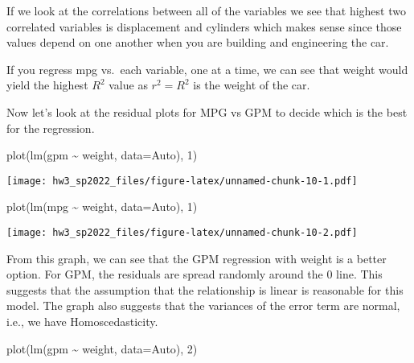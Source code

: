 \documentclass[
]{article}
\newenvironment{Shaded}{\begin{snugshade}}{\end{snugshade}}
\newcommand{\AttributeTok}[1]{\textcolor[rgb]{0.77,0.63,0.00}{#1}}
\newcommand{\DecValTok}[1]{\textcolor[rgb]{0.00,0.00,0.81}{#1}}
\newcommand{\FunctionTok}[1]{\textcolor[rgb]{0.00,0.00,0.00}{#1}}
\newcommand{\NormalTok}[1]{#1}
\newcommand{\OtherTok}[1]{\textcolor[rgb]{0.56,0.35,0.01}{#1}}
\newcommand{\SpecialCharTok}[1]{\textcolor[rgb]{0.00,0.00,0.00}{#1}}
\begin{document}
If we look at the correlations between all of the variables we see that
highest two correlated variables is displacement and cylinders which
makes sense since those values depend on one another when you are
building and engineering the car.

If you regress mpg vs.~each variable, one at a time, we can see that
weight would yield the highest \(R^2\) value as \(r^2 = R^2\) is the
weight of the car.

Now let's look at the residual plots for MPG vs GPM to decide which is
the best for the regression.

\begin{Shaded}
\end{Shaded}

\begin{Shaded}
\begin{Highlighting}[]
\FunctionTok{plot}\NormalTok{(}\FunctionTok{lm}\NormalTok{(gpm }\SpecialCharTok{\textasciitilde{}}\NormalTok{ weight, }\AttributeTok{data=}\NormalTok{Auto), }\DecValTok{1}\NormalTok{)}
\end{Highlighting}
\end{Shaded}

\texttt{[image: hw3\_sp2022\_files/figure-latex/unnamed-chunk-10-1.pdf]}

\begin{Shaded}
\begin{Highlighting}[]
\FunctionTok{plot}\NormalTok{(}\FunctionTok{lm}\NormalTok{(mpg }\SpecialCharTok{\textasciitilde{}}\NormalTok{ weight, }\AttributeTok{data=}\NormalTok{Auto), }\DecValTok{1}\NormalTok{)}
\end{Highlighting}
\end{Shaded}

\texttt{[image: hw3\_sp2022\_files/figure-latex/unnamed-chunk-10-2.pdf]}

From this graph, we can see that the GPM regression with weight is a
better option. For GPM, the residuals are spread randomly around the 0
line. This suggests that the assumption that the relationship is linear
is reasonable for this model. The graph also suggests that the variances
of the error term are normal, i.e., we have Homoscedasticity.

\begin{Shaded}
\begin{Highlighting}[]
\FunctionTok{plot}\NormalTok{(}\FunctionTok{lm}\NormalTok{(gpm }\SpecialCharTok{\textasciitilde{}}\NormalTok{ weight, }\AttributeTok{data=}\NormalTok{Auto), }\DecValTok{2}\NormalTok{)}
\end{Highlighting}
\end{Shaded}
\end{document}
